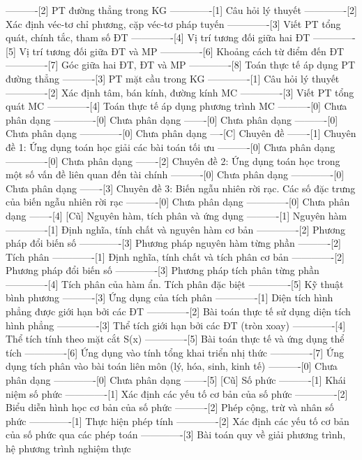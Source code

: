 ----------[2] PT đường thẳng trong KG
-------------[1] Câu hỏi lý thuyết
-------------[2] Xác định véc-tơ chỉ phương, cặp véc-tơ pháp tuyến
-------------[3] Viết PT tổng quát, chính tắc, tham số ĐT
-------------[4] Vị trí tương đối giữa hai ĐT
-------------[5] Vị trí tương đối giữa ĐT và MP
-------------[6] Khoảng cách từ điểm đến ĐT
-------------[7] Góc giữa hai ĐT, ĐT và MP
-------------[8] Toán thực tế áp dụng PT đường thẳng
----------[3] PT mặt cầu trong KG
-------------[1] Câu hỏi lý thuyết
-------------[2] Xác định tâm, bán kính, đường kính MC
-------------[3] Viết PT tổng quát MC
-------------[4] Toán thực tế áp dụng phương trình MC
----------[0] Chưa phân dạng
-------------[0] Chưa phân dạng
-------[0] Chưa phân dạng
----------[0] Chưa phân dạng
-------------[0] Chưa phân dạng
----[C] Chuyên đề
-------[1] Chuyên đề 1: Ứng dụng toán học giải các bài toán tối ưu
----------[0] Chưa phân dạng
-------------[0] Chưa phân dạng
-------[2] Chuyên đề 2: Ứng dụng toán học trong một số vấn đề liên quan đến tài chính
----------[0] Chưa phân dạng
-------------[0] Chưa phân dạng
-------[3] Chuyên đề 3: Biến ngẫu nhiên rời rạc. Các số đặc trưng của biến ngẫu nhiên rời rạc
----------[0] Chưa phân dạng
-------------[0] Chưa phân dạng
-------[4] [Cũ] Nguyên hàm, tích phân và ứng dụng
----------[1] Nguyên hàm
-------------[1] Định nghĩa, tính chất và nguyên hàm cơ bản
-------------[2] Phương pháp đổi biến số
-------------[3] Phương pháp nguyên hàm từng phần
----------[2] Tích phân
-------------[1] Định nghĩa, tính chất và tích phân cơ bản
-------------[2] Phương pháp đổi biến số
-------------[3] Phương pháp tích phân từng phần
-------------[4] Tích phân của hàm ẩn. Tích phân đặc biệt
-------------[5] Kỹ thuật bình phương
----------[3] Ứng dụng của tích phân
-------------[1] Diện tích hình phẳng được giới hạn bởi các ĐT
-------------[2] Bài toán thực tế sử dụng diện tích hình phẳng
-------------[3] Thể tích giới hạn bởi các ĐT (tròn xoay)
-------------[4] Thể tích tính theo mặt cắt S(x)
-------------[5] Bài toán thực tế và ứng dụng thể tích
-------------[6] Ứng dụng vào tính tổng khai triển nhị thức
-------------[7] Ứng dụng tích phân vào bài toán liên môn (lý, hóa, sinh, kinh tế)
----------[0] Chưa phân dạng
-------------[0] Chưa phân dạng
-------[5] [Cũ] Số phức
----------[1] Khái niệm số phức
-------------[1] Xác định các yếu tố cơ bản của số phức
-------------[2] Biểu diễn hình học cơ bản của số phức
----------[2] Phép cộng, trừ và nhân số phức
-------------[1] Thực hiện phép tính
-------------[2] Xác định các yếu tố cơ bản của số phức qua các phép toán
-------------[3] Bài toán quy về giải phương trình, hệ phương trình nghiệm thực
